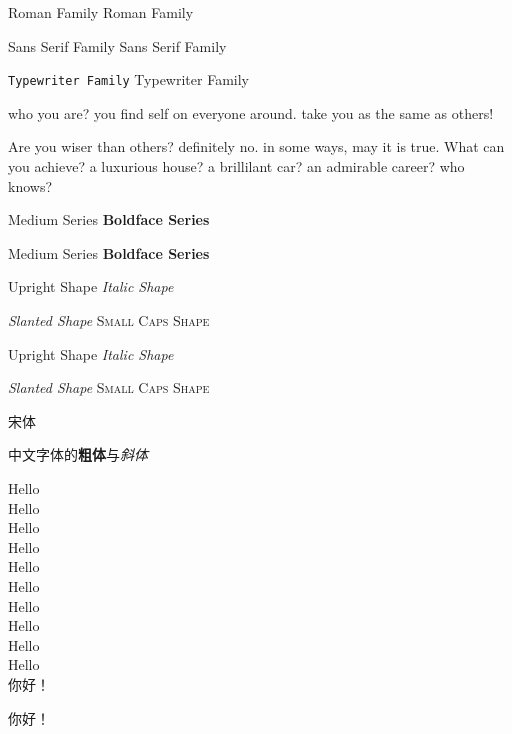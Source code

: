 \documentclass{article}
\begin{document}
	\textrm{Roman Family} 	%
	\rmfamily Roman Family	%
	
	\textsf{Sans Serif Family}
	\sffamily Sans Serif Family
	
	\texttt{Typewriter Family}
	\ttfamily Typewriter Family
	
	
	{\sffamily who you are? you find self on everyone around.
	take you as the same as others!}
	
	{\ttfamily Are you wiser than others? definitely no. in some ways, may it is true. What can you achieve? a luxurious house? a brillilant car? an admirable career? who knows?}
	
	
	\textmd{Medium Series} \textbf{Boldface Series}
	
	{\mdseries Medium Series} {\bfseries Boldface Series}
	
	\textup{Upright Shape} \textit{Italic Shape}
	
	\textsl{Slanted Shape} \textsc{Small Caps Shape}
	
	{\upshape Upright Shape} {\itshape Italic Shape} 
	
	{\slshape Slanted Shape} {\scshape Small Caps Shape}
	
	{\songti 宋体}   
	
	中文字体的\textbf{粗体}与\textit{斜体}
	
	
	{\tiny				Hello}\\
	{\scriptsize		Hello}\\
	{\footnotesize		Hello}\\
	{\small				Hello}\\
	{\normalsize		Hello}\\
	{\large				Hello}\\
	{\Large				Hello}\\
	{\LARGE				Hello}\\
	{\huge				Hello}\\
	{\Huge				Hello}\\
	
	你好！
	
	你好！
	
\end{document}
